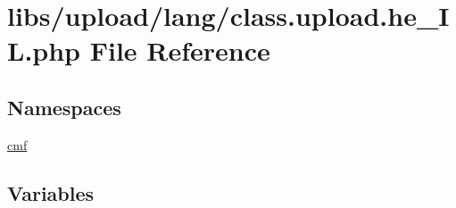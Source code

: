 \hypertarget{class_8upload_8he___i_l_8php}{}\section{libs/upload/lang/class.upload.\+he\+\_\+\+I\+L.\+php File Reference}
\label{class_8upload_8he___i_l_8php}
\subsection*{Namespaces}
\begin{DoxyCompactItemize}
\item 
 \hyperlink{namespacecmf}{cmf}
\end{DoxyCompactItemize}
\subsection*{Variables}
